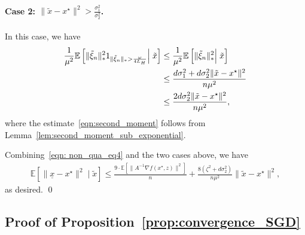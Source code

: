 \documentclass[11pt,twoside]{article}
\numberwithin{equation}{section}
\newcommand{\EE}{\mathbb{E}}
\newcommand{\1}{\mathbf{1}}
\theoremstyle{remark}
\theoremstyle{plain}
\newcommand{\liph}{L_H}
\newcommand{\lmin}{\omega}
\begin{document}
\paragraph{Case 2: $\|\tilde x -x^\star\|^2 >\frac{\sigma_1^2}{\sigma_2^2}$.} 
In this case, we have
\begin{align}\label{eqn:second_moment}
\frac{1}{\mu^2}\EE\left[\|\tilde   \xi_n\|_*^2 1_{\|\tilde  \xi_n\|_*  > \frac{\lmin}{4\liph}}\Big|\; \tilde x \right] & \le \frac{1}{\mu^2}\EE\left[\|\tilde   \xi_n\|_* ^2 \Big|\; \tilde x\right] \notag\\
&\le \frac{d \sigma_1^2 + d \sigma_2^2\|\tilde x - x^\star\|^2}{n\mu^2} \\
&\le \frac{2d\sigma_2^2 \|\tilde x - x^\star\|^2}{n\mu^2}, \notag
\end{align}
where the estimate~\eqref{eqn:second_moment} follows from Lemma~\ref{lem:second_moment_sub_exponential}.

\smallskip
Combining~\eqref{eqn: non_qua_eq4} and the two cases above, we have 
\begin{align*}
\EE[\|\underline{x} - x^\star\|^2 \mid \tilde x]  \le  \frac{9 \cdot \EE[\|A^{-1} \nabla f(x^\star,z)\|^2]}{n} + \frac{8 (\zeta^2 + d\sigma_2^2)}{n \mu^2}\|\tilde x - x^\star\|^2 ,
\end{align*}
as desired.
\qed

\subsection{Proof of  Proposition~\ref{prop:convergence_SGD}} \label{appendix:stochastic_opt_subroutine_SGD}
\end{document}
